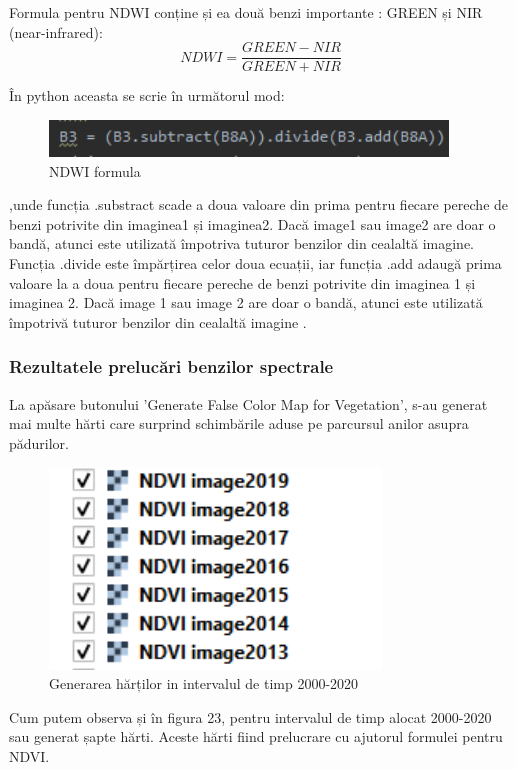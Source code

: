 \documentclass[12pt,a4paper]{article}
\theoremstyle{definition}
\theoremstyle{remark}
\begin{document}
     Formula pentru NDWI conține și ea două benzi importante : GREEN și NIR (near-infrared):
    $$ NDWI = \frac{GREEN-NIR}{GREEN+NIR} $$
   
  În python aceasta se scrie în următorul mod:
\begin{figure}[H]
  \centering
  \includegraphics[width=300pt]{ndwi.PNG}
  \caption{NDWI formula}   
\end{figure}

    
     ,unde funcția .substract scade a doua valoare din prima pentru fiecare pereche de benzi potrivite din imaginea1 și imaginea2. Dacă image1 sau image2 are doar o bandă, atunci este utilizată împotriva tuturor benzilor din cealaltă imagine. Funcția .divide este împărțirea celor doua ecuații, iar funcția .add adaugă prima valoare la a doua pentru fiecare pereche de benzi potrivite din imaginea 1 și imaginea 2. Dacă image 1 sau image 2 are doar o bandă, atunci este utilizată împotrivă tuturor benzilor din cealaltă
     imagine \cite{formula}.
\subsubsection{Rezultatele prelucări benzilor spectrale}

La apăsare butonului 'Generate False Color Map for Vegetation', s-au generat mai multe  hărti care surprind schimbările aduse pe parcursul anilor asupra pădurilor.

\begin{figure}[H]
  \centering
  \includegraphics[width=250pt]{ani.PNG}
  \caption{Generarea hărților in intervalul de timp 2000-2020}   
\end{figure}

Cum putem observa și în figura 23, pentru intervalul de timp alocat 2000-2020 sau generat șapte hărti. Aceste hărti fiind prelucrare cu ajutorul formulei pentru NDVI.
\end{document}
